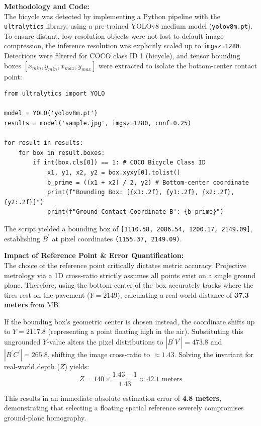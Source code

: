 \begin{studentSpace}
    \textbf{Methodology and Code:} \\
The bicycle was detected by implementing a Python pipeline with the \texttt{ultralytics} library, using a pre-trained YOLOv8 medium model (\texttt{yolov8m.pt}). To ensure distant, low-resolution objects were not lost to default image compression, the inference resolution was explicitly scaled up to \texttt{imgsz=1280}. Detections were filtered for COCO class ID 1 (bicycle), and tensor bounding boxes $[x_{min}, y_{min}, x_{max}, y_{max}]$ were extracted to isolate the bottom-center contact point:

\begin{verbatim}
from ultralytics import YOLO

model = YOLO('yolov8m.pt')
results = model('sample.jpg', imgsz=1280, conf=0.25)

for result in results:
    for box in result.boxes:
        if int(box.cls[0]) == 1: # COCO Bicycle Class ID
            x1, y1, x2, y2 = box.xyxy[0].tolist()
            b_prime = ((x1 + x2) / 2, y2) # Bottom-center coordinate
            print(f"Bounding Box: [{x1:.2f}, {y1:.2f}, {x2:.2f}, {y2:.2f}]")
            print(f"Ground-Contact Coordinate B': {b_prime}")
\end{verbatim}

The script yielded a bounding box of \texttt{[1110.58, 2086.54, 1200.17, 2149.09]}, establishing $B^{\prime}$ at pixel coordinates \texttt{(1155.37, 2149.09)}.

\vspace{0.3cm}
\textbf{Impact of Reference Point \& Error Quantification:} \\
The choice of the reference point critically dictates metric accuracy. Projective metrology via a 1D cross-ratio strictly assumes all points exist on a single ground plane. Therefore, using the bottom-center of the box accurately tracks where the tires rest on the pavement ($Y = 2149$), calculating a real-world distance of \textbf{37.3 meters} from MB.

If the bounding box's geometric center is chosen instead, the coordinate shifts up to $Y = 2117.8$ (representing a point floating high in the air). Substituting this ungrounded $Y$-value alters the pixel distributions to $|B^{\prime}V^{\prime}| = 473.8$ and $|B^{\prime}C^{\prime}| = 265.8$, shifting the image cross-ratio to $\approx 1.43$. Solving the invariant for real-world depth ($Z$) yields:
$$ Z = 140 \times \frac{1.43 - 1}{1.43} \approx 42.1\text{ meters} $$

This results in an immediate absolute estimation error of \textbf{4.8 meters}, demonstrating that selecting a floating spatial reference severely compromises ground-plane homography.
\end{studentSpace}


